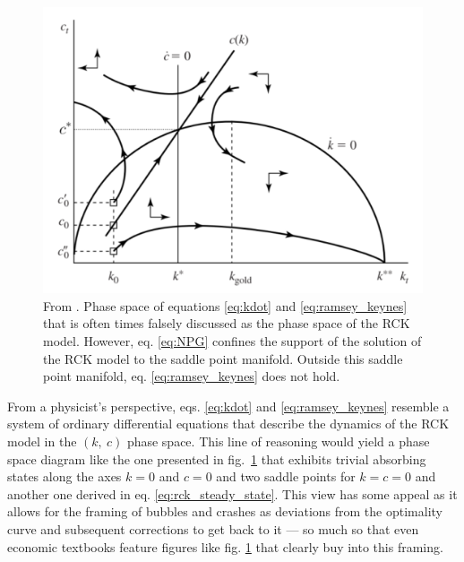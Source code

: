 \begin{figure}[t]
  \begin{minipage}[c]{0.4\textwidth}

      \caption[Phase space diagram of the original Ramsey-Cass-Koopmans model]{From \cite[p. 100]{Barro2004}. Phase space of equations \eqref{eq:kdot} and \eqref{eq:ramsey_keynes} that is often times falsely discussed as the phase space of the RCK model. However, eq. \eqref{eq:NPG} confines the support of the solution of the RCK model to the saddle point manifold. Outside this saddle point manifold, eq. \eqref{eq:ramsey_keynes} does not hold.\label{fig:rck_phase_space}}
  \end{minipage}
  \begin{minipage}[c]{0.6\textwidth}
        \includegraphics[width = 1 \textwidth]{./figures/RCK_phase_space.png}
  \end{minipage}\hfill

\end{figure}
From a physicist's perspective, eqs. \eqref{eq:kdot} and \eqref{eq:ramsey_keynes} resemble a system of ordinary differential equations that describe the dynamics of the RCK model in the $(k,~c)$ phase space. This line of reasoning would yield a phase space diagram like the one presented in fig.~\ref{fig:rck_phase_space} that exhibits trivial absorbing states along the axes $k=0$ and $c=0$ and two saddle points for $k=c=0$ and another one derived in eq. \eqref{eq:rck_steady_state}.
This view has some appeal as it allows for the framing of bubbles and crashes as deviations from the optimality curve and subsequent corrections to get back to it --- so much so that even economic textbooks feature figures like fig. \ref{fig:rck_phase_space} that clearly buy into this framing.

